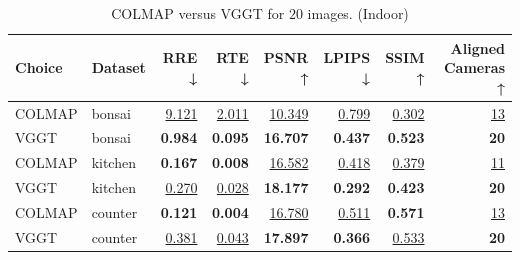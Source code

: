 \begin{table}[H]
\caption{\ifdefined\customcaption \customcaption \else COLMAP versus VGGT for $20$ images. (Indoor) \fi}
\label{tab:01_num_images_sparse_indoor}
\centering
\scriptsize
\begin{tabular}{llrrrrrr}
\toprule
Choice & Dataset & RRE ↓ & RTE ↓ & PSNR ↑ & LPIPS ↓ & SSIM ↑ & Aligned Cameras ↑ \\
\midrule
COLMAP & bonsai & \underline{9.121} & \underline{2.011} & \underline{10.349} & \underline{0.799} & \underline{0.302} & \underline{13} \\
VGGT & bonsai & \textbf{0.984} & \textbf{0.095} & \textbf{16.707} & \textbf{0.437} & \textbf{0.523} & \textbf{20} \\
\midrule
COLMAP & kitchen & \textbf{0.167} & \textbf{0.008} & \underline{16.582} & \underline{0.418} & \underline{0.379} & \underline{11} \\
VGGT & kitchen & \underline{0.270} & \underline{0.028} & \textbf{18.177} & \textbf{0.292} & \textbf{0.423} & \textbf{20} \\
\midrule
COLMAP & counter & \textbf{0.121} & \textbf{0.004} & \underline{16.780} & \underline{0.511} & \textbf{0.571} & \underline{13} \\
VGGT & counter & \underline{0.381} & \underline{0.043} & \textbf{17.897} & \textbf{0.366} & \underline{0.533} & \textbf{20} \\
\bottomrule
\end{tabular}
\end{table}